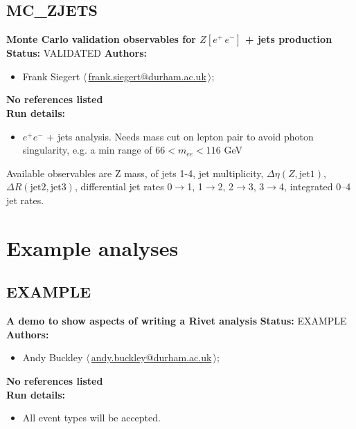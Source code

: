 \clearpage


\clearpage

\subsection{MC\_ZJETS}
\textbf{Monte Carlo validation observables for $Z[e^+ \, e^-]$ + jets production}\newline
\textbf{Status:} VALIDATED\newline
\textbf{Authors:}
\begin{itemize}
  \item Frank Siegert $\langle\,$\href{mailto:frank.siegert@durham.ac.uk}{frank.siegert@durham.ac.uk}$\,\rangle$;
\end{itemize}
\textbf{No references listed}\\ 
\textbf{Run details:}
\begin{itemize}

  \item $e^+ e^-$ + jets analysis. Needs mass cut on lepton pair to avoid  photon singularity, e.g. a min range of $66 < m_{ee} < 116$ GeV\end{itemize}

\noindent Available observables are Z mass, \pT of jets 1-4, jet multiplicity, $\Delta\eta(Z, \text{jet1})$, $\Delta R(\text{jet2}, \text{jet3})$,  differential jet rates 0\ensuremath{\to}1, 1\ensuremath{\to}2, 2\ensuremath{\to}3, 3\ensuremath{\to}4, integrated 0--4 jet  rates.

\clearpage


\section{Example analyses}
\subsection{EXAMPLE}
\textbf{A demo to show aspects of writing a Rivet analysis}\newline
\textbf{Status:} EXAMPLE\newline
\textbf{Authors:}
\begin{itemize}
  \item Andy Buckley $\langle\,$\href{mailto:andy.buckley@durham.ac.uk}{andy.buckley@durham.ac.uk}$\,\rangle$;
\end{itemize}
\textbf{No references listed}\\ 
\textbf{Run details:}
\begin{itemize}

  \item All event types will be accepted.\end{itemize}

